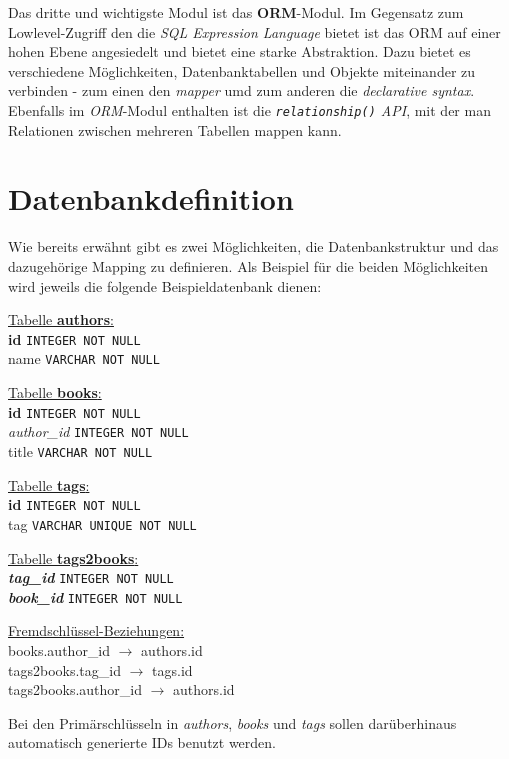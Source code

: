 Das dritte und wichtigste Modul ist das \textbf{ORM}-Modul. Im Gegensatz zum
Lowlevel-Zugriff den die \emph{SQL Expression Language} bietet ist das ORM auf
einer hohen Ebene angesiedelt und bietet eine starke Abstraktion. Dazu bietet es
verschiedene Möglichkeiten, Datenbanktabellen und Objekte miteinander zu
verbinden - zum einen den \emph{mapper} umd zum anderen die \emph{declarative
syntax}. Ebenfalls im \emph{ORM}-Modul enthalten ist die
\emph{\texttt{relationship()} API}, mit der man Relationen zwischen mehreren
Tabellen mappen kann.


\section{Datenbankdefinition}

Wie bereits erwähnt gibt es zwei Möglichkeiten, die Datenbankstruktur und das
dazugehörige Mapping zu definieren. Als Beispiel für die beiden Möglichkeiten
wird jeweils die folgende Beispieldatenbank dienen:

\ul{Tabelle \textbf{authors}:}\\
\textbf{id} \texttt{INTEGER NOT NULL}\\
name \texttt{VARCHAR NOT NULL}

\ul{Tabelle \textbf{books}:}\\
\textbf{id} \texttt{INTEGER NOT NULL}\\
\textit{author\_id} \texttt{INTEGER NOT NULL}\\
title \texttt{VARCHAR NOT NULL}

\ul{Tabelle \textbf{tags}:}\\
\textbf{id} \texttt{INTEGER NOT NULL}\\
tag \texttt{VARCHAR UNIQUE NOT NULL}

\ul{Tabelle \textbf{tags2books}:}\\
\textbf{\textit{tag\_id}} \texttt{INTEGER NOT NULL}\\
\textbf{\textit{book\_id}} \texttt{INTEGER NOT NULL}

\ul{Fremdschl\"ussel-Beziehungen:}\\
books.author\_id $\rightarrow$ authors.id\\
tags2books.tag\_id $\rightarrow$ tags.id\\
tags2books.author\_id $\rightarrow$ authors.id

Bei den Primärschlüsseln in \emph{authors}, \emph{books} und \emph{tags} sollen
darüberhinaus automatisch generierte IDs benutzt werden.

